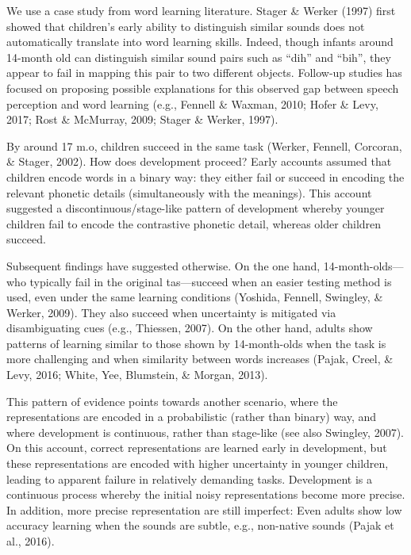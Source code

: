 \documentclass[10pt, letterpaper]{article}
\begin{document}
We use a case study from word learning literature. Stager \& Werker
(1997) first showed that children's early ability to distinguish similar
sounds does not automatically translate into word learning skills.
Indeed, though infants around 14-month old can distinguish similar sound
pairs such as ``dih'' and ``bih'', they appear to fail in mapping this
pair to two different objects. Follow-up studies has focused on
proposing possible explanations for this observed gap between speech
perception and word learning (e.g., Fennell \& Waxman, 2010; Hofer \&
Levy, 2017; Rost \& McMurray, 2009; Stager \& Werker, 1997).

By around 17 m.o, children succeed in the same task (Werker, Fennell,
Corcoran, \& Stager, 2002). How does development proceed? Early accounts
assumed that children encode words in a binary way: they either fail or
succeed in encoding the relevant phonetic details (simultaneously with
the meanings). This account suggested a discontinuous/stage-like pattern
of development whereby younger children fail to encode the contrastive
phonetic detail, whereas older children succeed.

Subsequent findings have suggested otherwise. On the one hand,
14-month-olds---who typically fail in the original tas---succeed when an
easier testing method is used, even under the same learning conditions
(Yoshida, Fennell, Swingley, \& Werker, 2009). They also succeed when
uncertainty is mitigated via disambiguating cues (e.g., Thiessen, 2007).
On the other hand, adults show patterns of learning similar to those
shown by 14-month-olds when the task is more challenging and when
similarity between words increases (Pajak, Creel, \& Levy, 2016; White,
Yee, Blumstein, \& Morgan, 2013).

This pattern of evidence points towards another scenario, where the
representations are encoded in a probabilistic (rather than binary) way,
and where development is continuous, rather than stage-like (see also
Swingley, 2007). On this account, correct representations are learned
early in development, but these representations are encoded with higher
uncertainty in younger children, leading to apparent failure in
relatively demanding tasks. Development is a continuous process whereby
the initial noisy representations become more precise. In addition, more
precise representation are still imperfect: Even adults show low
accuracy learning when the sounds are subtle, e.g., non-native sounds
(Pajak et al., 2016).
\end{document}
